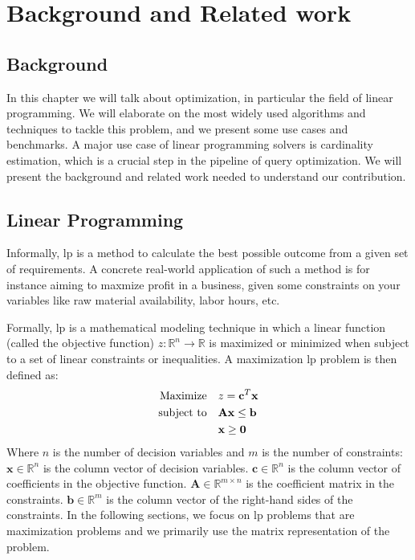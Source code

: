 
\chapter{Background and Related work}\label{chapter:relatedwork}

\section{Background}
In this chapter we will talk about optimization, in particular the field
of linear programming. We will elaborate on
the most widely used algorithms and techniques to tackle this problem,
and we present some use cases and benchmarks.
A major use case of linear programming solvers is cardinality estimation, which
is a crucial step in the pipeline of query optimization. We will present
the background and related work needed to understand our contribution.

\section{Linear Programming}
Informally, \gls{lp} is a method to calculate the best possible outcome from a given set
of requirements. A concrete real-world application of such a method is
for instance aiming to maxmize profit in a business, given some constraints on your variables
like raw material availability, labor hours, etc.

Formally, \gls{lp} is a mathematical modeling technique in which
a linear function (called the objective function) \( z: \mathbb{R}^n \to \mathbb{R} \)
is maximized or minimized when subject to a set of linear constraints or inequalities.
A maximization \gls{lp} problem is then defined as:
\begin{align}
    \text{Maximize} \quad   & z = \mathbf{c}^T \mathbf{x} \notag            \\
    \text{subject to} \quad & \mathbf{A} \mathbf{x} \leq \mathbf{b} \notag  \\
                            & \mathbf{x} \geq \mathbf{0} \label{LP_Problem}
\end{align}
Where $n$ is the number of decision variables and $m$ is the number of constraints:
\(\mathbf{x} \in \mathbb{R}^n\) is the column vector of decision variables.
\(\mathbf{c} \in \mathbb{R}^n\) is the column vector of coefficients in the objective function.
\(\mathbf{A} \in \mathbb{R}^{m \times n}\) is the coefficient matrix in the constraints.
\(\mathbf{b} \in \mathbb{R}^m\) is the column vector of the right-hand sides of the constraints.
In the following sections, we focus on \gls{lp} problems that are maximization problems and we primarily
use the matrix representation of the problem.

